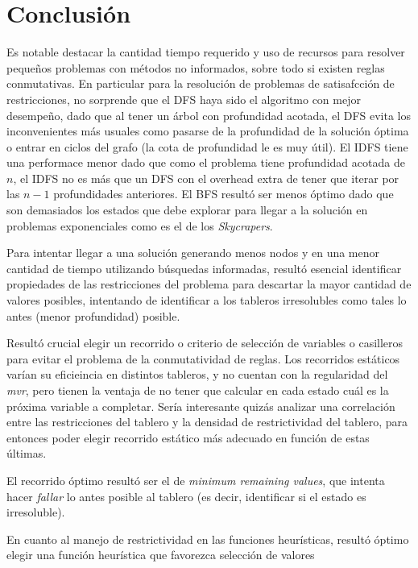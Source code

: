 \documentclass[%
    final,
    reprint,
    notitlepage,
    narroweqnarray,
    inline,
    twoside,
    invited
    ]{ieee}
\begin{document}
\section{Conclusión}

\PARstart Es notable destacar la cantidad tiempo requerido y uso de recursos para resolver pequeños problemas con métodos no informados, sobre todo si existen reglas conmutativas. 
 En particular para la resolución de problemas de satisafcción de restricciones, no sorprende que el DFS haya sido el algoritmo con mejor desempeño, dado que al tener un árbol con profundidad acotada, el DFS evita los inconvenientes más usuales como pasarse de la profundidad de la solución óptima o entrar en ciclos del grafo (la cota de profundidad le es muy útil). El IDFS tiene una performace menor dado que como el problema tiene profundidad acotada de $n$, el IDFS no es más que un DFS con el overhead extra de tener que iterar por las $n-1$ profundidades anteriores. El BFS resultó ser menos óptimo dado que son demasiados los estados que debe explorar para llegar a la solución en problemas exponenciales como es el de los \textit{Skycrapers}. 
\par Para intentar llegar a una solución generando menos nodos y en una menor cantidad de tiempo utilizando búsquedas informadas, resultó esencial identificar 
propiedades de las restricciones del problema para descartar la mayor cantidad de valores posibles, intentando de identificar a los tableros irresolubles como tales 
lo antes (menor profundidad) posible.
\par Resultó crucial elegir un recorrido o criterio de selección de variables o casilleros para evitar el problema de la conmutatividad de reglas. Los 
recorridos estáticos varían su eficieincia en distintos tableros, y no cuentan con la regularidad del \textit{mvr}, pero tienen la ventaja de no 
tener que calcular en cada estado cuál es la próxima variable a completar. Sería interesante quizás analizar una correlación entre las restricciones 
del tablero y la densidad de restrictividad del tablero, para entonces poder elegir recorrido estático más adecuado en función de estas últimas.
\par El recorrido óptimo resultó ser el de \textit{minimum remaining values}, que intenta hacer \textit{fallar} lo antes posible al tablero (es decir, 
identificar si el estado es irresoluble).
\par En cuanto al manejo de restrictividad en las funciones heurísticas, resultó óptimo elegir una función heurística que favorezca selección de valores 
\end{document}

